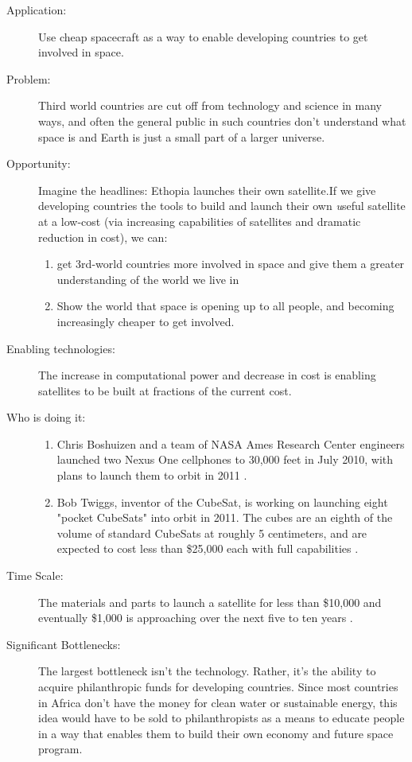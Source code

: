 \documentclass[letter,11pt]{article}
\begin{document}
\begin{description}
\item[Application:] Use cheap spacecraft as a way to enable developing countries to get involved in space.

\item[Problem:] Third world countries are cut off from technology and science in many ways, and often the general public in such countries don't understand what space is and Earth is just a small part of a larger universe.  

\item[Opportunity:]
Imagine the headlines: Ethopia launches their own satellite.If we give developing countries the tools to build and launch their own {\emph useful} satellite at a low-cost (via increasing capabilities of satellites and dramatic reduction in cost), we can:
\begin{enumerate}
\item get 3rd-world countries more involved in space and give them a greater understanding of the world we live in
\item Show the world that space is opening up to all people, and becoming increasingly cheaper to get involved. 
\end{enumerate}

\item[Enabling technologies:]
The increase in computational power and decrease in cost is enabling satellites to be built at fractions of the current cost.

\item[Who is doing it:]
\hfill\begin{enumerate}
\item Chris Boshuizen and a team of NASA Ames Research Center engineers launched two Nexus One cellphones to 30,000 feet in July 2010, with plans to launch them to orbit in 2011 \cite{McNally2010}.
\item Bob Twiggs, inventor of the CubeSat, is working on launching eight "pocket CubeSats" into orbit in 2011. The cubes are an eighth of the volume of standard CubeSats at roughly 5 centimeters, and are expected to cost less than \$25,000 each with full capabilities \cite{Patel2010}.
\end{enumerate}

\item[Time Scale:] The materials and parts to launch a satellite for less than \$10,000 and eventually \$1,000 is approaching over the next five to ten years \cite{Patel2010}.

\item[Significant Bottlenecks:] 
The largest bottleneck isn't the technology. Rather, it's the ability to acquire philanthropic funds for developing countries. Since most countries in Africa don't have the money for clean water or sustainable energy, this idea would have to be sold to philanthropists as a means to educate people in a way that enables them to build their own economy and future space program.
\end{description}
\end{document}
